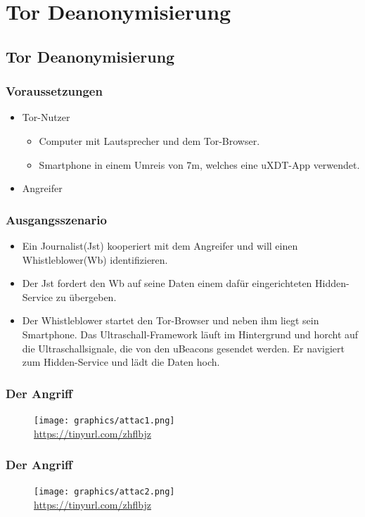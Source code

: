 \documentclass{beamer}
\begin{document}
\section{Tor Deanonymisierung}
	\subsection*{Tor Deanonymisierung}
		\begin{frame}\frametitle{Voraussetzungen}
			\begin{itemize}
				\item Tor-Nutzer
				\begin{itemize}
					\item Computer mit Lautsprecher und dem Tor-Browser.
					\item Smartphone in einem Umreis von 7m, welches eine uXDT-App verwendet.
				\end{itemize}
				\item Angreifer
			\end{itemize}
		\end{frame}
		
		\begin{frame}\frametitle{Ausgangsszenario}
		\begin{itemize}
			\item Ein Journalist(Jst) kooperiert mit dem Angreifer und will einen Whistleblower(Wb) identifizieren.
			\item Der Jst fordert den Wb auf seine Daten einem dafür eingerichteten Hidden-Service zu übergeben.
			\item Der Whistleblower startet den Tor-Browser und neben ihm liegt sein Smartphone. Das Ultraschall-Framework läuft im Hintergrund und horcht auf die Ultraschallsignale, die von den uBeacons gesendet werden. Er navigiert zum Hidden-Service und lädt die Daten hoch.
		\end{itemize}
		\end{frame}
		
		\begin{frame}\frametitle{Der Angriff}
		\begin{figure}[h]
			\centering
			\texttt{[image: graphics/attac1.png]}\\
			\tiny\url{https://tinyurl.com/zhflbjz}
		\end{figure}
		\end{frame}
		
		\begin{frame}\frametitle{Der Angriff}
		\begin{figure}[h]
			\centering
			\texttt{[image: graphics/attac2.png]}\\
			\tiny\url{https://tinyurl.com/zhflbjz}
		\end{figure}
		\end{frame}
		
\end{document}
